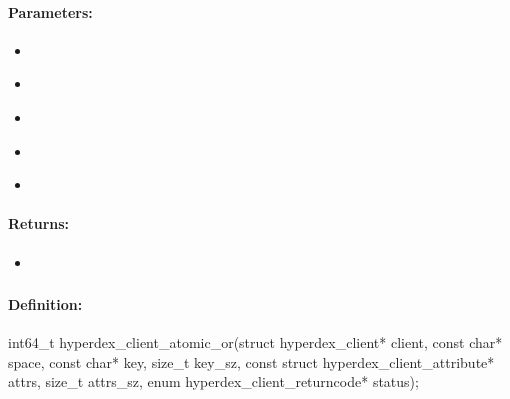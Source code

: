 \paragraph{Parameters:}
\begin{itemize}[noitemsep]
\item {}\\

\item {}\\

\item {}\\

\item {}\\

\item {}\\

\end{itemize}

\paragraph{Returns:}
\begin{itemize}[noitemsep]
\item {}\\

\end{itemize}

\pagebreak
\subsubsection{}
\label{api:c:atomic_or}


\paragraph{Definition:}
\begin{ccode}
int64_t hyperdex_client_atomic_or(struct hyperdex_client* client,
        const char* space,
        const char* key, size_t key_sz,
        const struct hyperdex_client_attribute* attrs, size_t attrs_sz,
        enum hyperdex_client_returncode* status);
\end{ccode}

